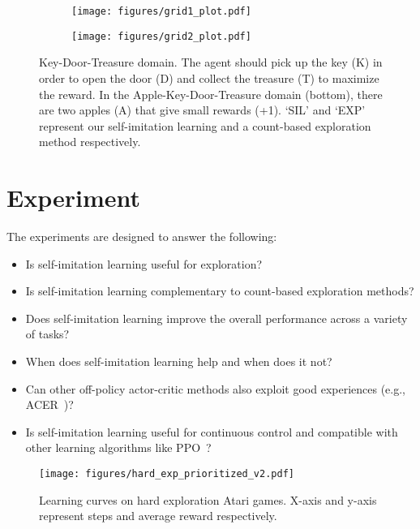 \documentclass{article}
\newcommand{\cutsectionup}{\vspace*{-0.08in}}\newcommand{\cutsectiondown}{\vspace*{-0.05in}}
\begin{document}
\begin{figure}
	\centering
	\begin{subfigure}{0.98\linewidth}
		\centering
		\hskip 0.1in
		\texttt{[image: figures/grid1\_plot.pdf]}
	\end{subfigure}
\centering
	\begin{subfigure}{0.98\linewidth}
		\centering
		\hskip 0.1in
		\texttt{[image: figures/grid2\_plot.pdf]}
	\end{subfigure}
	\vskip -0.05in
	\caption{Key-Door-Treasure domain. The agent should pick up the key (K) in order to open the door (D) and collect the treasure (T) to maximize the reward. In the Apple-Key-Door-Treasure domain (bottom), there are two apples (A) that give small rewards (+1). `SIL' and `EXP' represent our self-imitation learning and a count-based exploration method respectively. }
	\label{fig:grid-world}
	\vskip -0.15in
\end{figure}


\cutsectionup
\section{Experiment} \label{sec:experiment}
\cutsectiondown
The experiments are designed to answer the following:
\begin{itemize}[leftmargin=*]
\setlength\itemsep{0em}
\item Is self-imitation learning useful for exploration?
\item Is self-imitation learning complementary to count-based exploration methods?
\item Does self-imitation learning improve the overall performance across a variety of tasks?
\item When does self-imitation learning help and when does it not?
\item Can other off-policy actor-critic methods also exploit good experiences (e.g., ACER~\citep{Wang2016SampleEA})?
\item Is self-imitation learning useful for continuous control and compatible with other learning algorithms like PPO~\citep{Schulman2017ProximalPO}?
\end{itemize}

\begin{figure*}
	\centering
	\texttt{[image: figures/hard\_exp\_prioritized\_v2.pdf]}
	\vspace{-0.1in}
	\caption{Learning curves on hard exploration Atari games. X-axis and y-axis represent steps and average reward respectively. }
	\label{fig:hard-exploration}
	\vskip -0.1in
\end{figure*}
\end{document}
